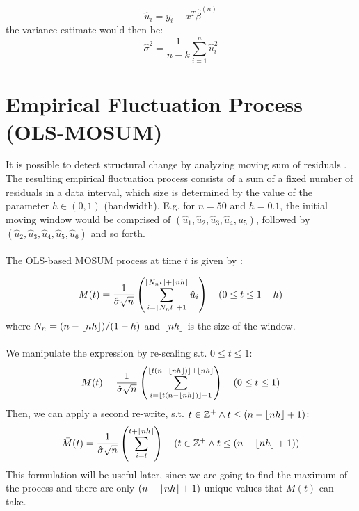 \documentclass[main.tex]{subfiles}
\begin{document}
\begin{equation} \label{eq:residuals}
\hat{u}_i = y_i - x^T\hat{\beta}^{(n)}
\end{equation}
the variance estimate would then be:
\begin{equation} \label{eq:sigma}
\hat{\sigma}^{2}=\frac{1}{n-k} \sum_{i=1}^{n} \hat{u}_{i}^{2}
\end{equation}

\section{Empirical Fluctuation Process (OLS-MOSUM)}
\label{sec:empirical_fluctuation}
It is possible to detect structural change by analyzing moving sum of residuals
\cite{strucchange}. The resulting empirical fluctuation process consists of a
sum of a fixed number of residuals in a data interval, which size is determined
by the value of the parameter $h \in (0,1)$ (bandwidth). E.g. for $n=50$ and $h=0.1$,
the initial moving window would be comprised of $(\hat{u}_1, \hat{u}_2,\hat{u}_3, \hat{u}_4,
\hat{u}_5)$, followed by $(\hat{u}_2,\hat{u}_3, \hat{u}_4,
\hat{u}_5, \hat{u}_6)$ and so forth.\\\\
The OLS-based MOSUM process at time $t$ is given by \cite{mosum_tests}:

\begin{equation}\label{eq:mosum_og}
M(t)=\frac{1}{\hat{\sigma} \sqrt{n}}
\left(\sum_{i=\lfloor N_{n} t\rfloor+1}^{\left\lfloor N_{n} t\right\rfloor+\lfloor
  n h\rfloor} \hat{u}_{i}\right) \quad(0 \leq t \leq 1-h)
\end{equation}
where $N_{n}=(n-\lfloor n h\rfloor) /(1-h)$ and $\lfloor n h\rfloor$ is the size of the
window. \\\\
We manipulate the expression by re-scaling s.t. $0 \leq t \leq 1$:
\begin{equation}
  M(t) =
  \frac{1}{\hat{\sigma} \sqrt{n}}
  \left(\sum_{i=\lfloor t(n - \lfloor nh\rfloor)\rfloor + 1}^{\lfloor t(n - \lfloor nh\rfloor)\rfloor + \lfloor nh\rfloor}\right)
  \quad(0 \leq t \leq 1)
\end{equation}
Then, we can apply a second re-write, s.t.
$t \in \mathbb{Z}^+ \wedge t \leq (n - \lfloor nh\rfloor + 1)$:
\begin{equation} \label{eq:mosum}
  \bar{M}(t) =
  \frac{1}{\hat{\sigma} \sqrt{n}}
  \left(\sum_{i=t}^{t + \lfloor nh\rfloor}\right)
  \quad(t \in \mathbb{Z}^+ \wedge t \leq (n - \lfloor nh\rfloor + 1))
\end{equation}
This formulation will be useful later, since we are going to find the maximum of
the process and there are only $(n - \lfloor nh\rfloor + 1)$ unique values that $M(t)$ can take.
\end{document}
